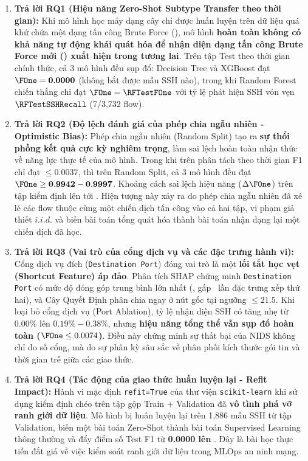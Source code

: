 \begin{enumerate}
    \item \textbf{Trả lời RQ1 (Hiệu năng Zero-Shot Subtype Transfer theo thời gian):}
    Khi mô hình học máy dạng cây chỉ được huấn luyện trên dữ liệu quá khứ chứa một dạng tấn công Brute Force (\FTP), mô hình \textbf{hoàn toàn không có khả năng tự động khái quát hóa để nhận diện dạng tấn công Brute Force mới (\SSH) xuất hiện trong tương lai}. Trên tập Test theo thời gian chính thức, cả 3 mô hình đều sụp đổ: Decision Tree và XGBoost đạt $\FOne = \mathbf{0.0000}$ (không bắt được mẫu SSH nào), trong khi Random Forest chiến thắng chỉ đạt $\FOne = \mathbf{\RFTestFOne}$ với tỷ lệ phát hiện SSH vỏn vẹn $\mathbf{\RFTestSSHRecall}$ (7/3,732 flow).

    \item \textbf{Trả lời RQ2 (Độ lệch đánh giá của phép chia ngẫu nhiên - Optimistic Bias):}
    Phép chia ngẫu nhiên (Random Split) tạo ra \textbf{sự thổi phồng kết quả cực kỳ nghiêm trọng}, làm sai lệch hoàn toàn nhận thức về năng lực thực tế của mô hình. Trong khi trên phân tách theo thời gian F1 chỉ đạt $\le 0.0037$, thì trên Random Split, cả 3 mô hình đều đạt $\FOne \ge \mathbf{0.9942 - 0.9997}$. Khoảng cách sai lệch hiệu năng ($\Delta\FOne$) trên tập kiểm định lên tới \textbf{\DeltaFOneRFRandomTime}. Hiện tượng này xảy ra do phép chia ngẫu nhiên đã xé lẻ các flow thuộc cùng một chiến dịch tấn công vào cả hai tập, vi phạm giả thiết $i.i.d.$ và biến bài toán tổng quát hóa thành bài toán nhận dạng lại một chiến dịch đã học.

    \item \textbf{Trả lời RQ3 (Vai trò của cổng dịch vụ và các đặc trưng hành vi):}
    Cổng dịch vụ đích (\texttt{Destination Port}) đóng vai trò là một \textbf{lối tắt học vẹt (Shortcut Feature) áp đảo}. Phân tích SHAP chứng minh \texttt{Destination Port} có mức độ đóng góp trung bình lớn nhất (\SHAPTopOneVal, gấp \SHAPRatioTopOneTwo\ lần đặc trưng xếp thứ hai), và Cây Quyết Định phân chia ngay ở nút gốc tại ngưỡng $\le 21.5$.
    Khi loại bỏ cổng dịch vụ (Port Ablation), tỷ lệ nhận diện SSH có tăng nhẹ từ 0.00\% lên $0.19\% - 0.38\%$, nhưng \textbf{hiệu năng tổng thể vẫn sụp đổ hoàn toàn ($\FOne \le 0.0074$)}. Điều này chứng minh sự thất bại của NIDS không chỉ do số cổng, mà do sự phân kỳ sâu sắc về phân phối kích thước gói tin và thời gian trễ giữa các giao thức.

    \item \textbf{Trả lời RQ4 (Tác động của giao thức huấn luyện lại - Refit Impact):}
    Hành vi mặc định \texttt{refit=True} của thư viện \texttt{scikit-learn} khi sử dụng kiểm định chéo trên tập gộp Train + Validation đã \textbf{vô tình phá vỡ ranh giới dữ liệu}. Mô hình bị huấn luyện lại trên 1,886 mẫu SSH từ tập Validation, biến một bài toán Zero-Shot thành bài toán Supervised Learning thông thường và đẩy điểm số Test F1 từ \textbf{0.0000 lên \XGBRefitTestFOne}. Đây là bài học thực tiễn đắt giá về việc kiểm soát ranh giới dữ liệu trong MLOps an ninh mạng.
\end{enumerate}

